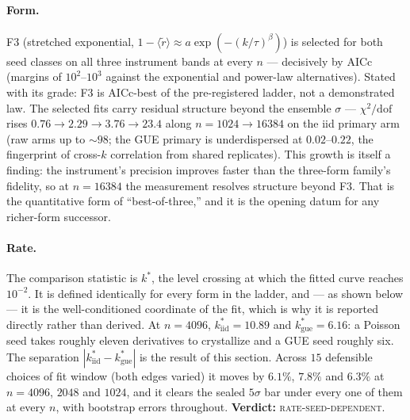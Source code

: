 \documentclass[11pt]{article}
\newcommand{\rt}{\widetilde{r}}
\newcommand{\gapdist}{1-\langle\rt\rangle}
\newcommand{\kstar}{k^{*}}
\newcommand{\verdict}[1]{\textsc{#1}}
\begin{document}
\paragraph{Form.} F3 (stretched exponential, $\gapdist\approx a\exp(-(k/\tau)^{\beta})$) is
selected for both seed classes on all three instrument bands at every $n$ --- decisively by AICc
(margins of $10^2$--$10^3$ against the exponential and power-law alternatives). Stated with its
grade: F3 is AICc-best of the pre-registered ladder, not a demonstrated law. The selected fits
carry residual structure beyond the ensemble $\sigma$ --- $\chi^2/\mathrm{dof}$ rises
$0.76\to2.29\to3.76\to23.4$ along $n=1024\to16384$ on the iid primary arm (raw arms up to
${\sim}98$; the GUE primary is underdispersed at $0.02$--$0.22$, the fingerprint of cross-$k$
correlation from shared replicates). This growth is itself a finding: the instrument's precision
improves faster than the three-form family's fidelity, so at $n=16384$ the measurement resolves
structure beyond F3. That is the quantitative form of ``best-of-three,'' and it is the opening
datum for any richer-form successor.

\paragraph{Rate.} The comparison statistic is $\kstar$, the level crossing at which the fitted
curve reaches $10^{-2}$. It is defined identically for every form in the ladder, and --- as
shown below --- it is the well-conditioned coordinate of the fit, which is why it is reported
directly rather than derived. At $n=4096$, $\kstar_{\mathrm{iid}}=10.89$ and
$\kstar_{\mathrm{gue}}=6.16$: a Poisson seed takes roughly eleven derivatives to crystallize
and a GUE seed roughly six. The separation $|\kstar_{\mathrm{iid}}-\kstar_{\mathrm{gue}}|$ is
the result of this section. Across $15$ defensible choices of fit window (both edges varied)
it moves by $6.1\%$, $7.8\%$ and $6.3\%$ at $n=4096$, $2048$ and $1024$, and it clears the
sealed $5\sigma$ bar under every one of them at every $n$, with bootstrap errors throughout.
\textbf{Verdict:} \verdict{rate-seed-dependent}.
\end{document}
